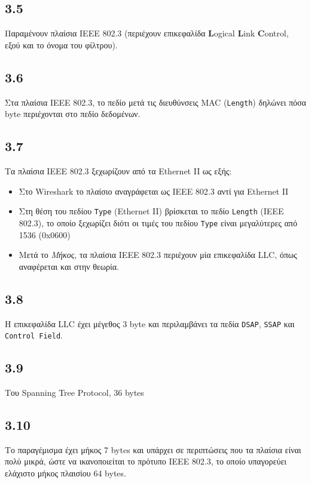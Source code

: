 		\subsection*{3.5}
			Παραμένουν πλαίσια IEEE 802.3 (περιέχουν επικεφαλίδα \textbf{L}ogical \textbf{L}ink \textbf{C}ontrol, εξού και το όνομα του φίλτρου).
		
		\subsection*{3.6}
			Στα πλαίσια IEEE 802.3, το πεδίο μετά τις διευθύνσεις MAC (\verb|Length|) δηλώνει πόσα byte περιέχονται στο πεδίο δεδομένων.
		
		\subsection*{3.7}
			Τα πλαίσια ΙΕΕΕ 802.3 ξεχωρίζουν από τα Ethernet II ως εξής:
				\begin{itemize}
					\item Στο Wireshark το πλαίσιο αναγράφεται ως IEEE 802.3 αντί για Ethernet II 
					\item Στη θέση του πεδίου \verb|Type| (Ethernet II) βρίσκεται το πεδίο \verb|Length| (IEEE 802.3), το οποίο ξεχωρίζει διότι οι τιμές του πεδίου \verb|Type| είναι μεγαλύτερες από 1536 (0x0600)
					\item Μετά το \textit{Μήκος}, τα πλαίσια IEEE 802.3 περιέχουν μία επικεφαλίδα LLC, όπως αναφέρεται και στην θεωρία.
				\end{itemize}
		
		\subsection*{3.8}
			Η επικεφαλίδα LLC έχει μέγεθος 3 byte και περιλαμβάνει τα πεδία \verb|DSAP|, \verb|SSAP| και \verb|Control Field|.
		
		\subsection*{3.9}
			Του Spanning Tree Protocol, 36 bytes
		
		\subsection*{3.10}
			Το παραγέμισμα έχει μήκος 7 bytes και υπάρχει σε περιπτώσεις που τα πλαίσια είναι πολύ μικρά, ώστε να ικανοποιείται το πρότυπο IEEE 802.3, το οποίο υπαγορεύει ελάχιστο μήκος πλαισίου 64 bytes.

